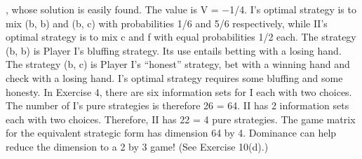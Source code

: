 \begin{framed}
, whose solution is
easily found. The value is V = −1/4. I’s optimal strategy is to mix (b, b) and (b, c) with
probabilities 1/6 and 5/6 respectively, while II’s optimal strategy is to mix c and f with
equal probabilities 1/2 each. The strategy (b, b) is Player I’s bluffing strategy. Its use
entails betting with a losing hand. The strategy (b, c) is Player I’s “honest” strategy, bet
with a winning hand and check with a losing hand. I’s optimal strategy requires some
bluffing and some honesty.
In Exercise 4, there are six information sets for I each with two choices. The number
of I’s pure strategies is therefore 26 = 64. II has 2 information sets each with two choices.
Therefore, II has 22 = 4 pure strategies. The game matrix for the equivalent strategic
form has dimension 64 by 4. Dominance can help reduce the dimension to a 2 by 3 game!
(See Exercise 10(d).)

\end{framed}
